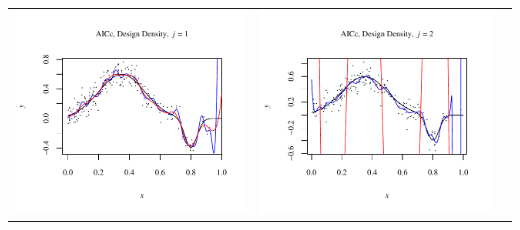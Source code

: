 \documentclass[11pt]{article}
\begin{document}
\begin{table}[h!]
  \begin{center}
    \renewcommand{\arraystretch}{1.5}
    \begin{tabular}{| >{\centering\arraybackslash}m{2.1in} |  >{\centering\arraybackslash}m{2.1in} |  >{\centering\arraybackslash}m{2.1in}|}
      \hline
      \includegraphics[width=1\linewidth,height=0.18\textheight]{Graphs/3/2/assignment5_a_3_2_1}&
      \includegraphics[width=1\linewidth,height=0.18\textheight]{Graphs/3/2/assignment5_a_3_2_2}&

\end{tabular}
\end{center}
\end{table}
\end{document}
